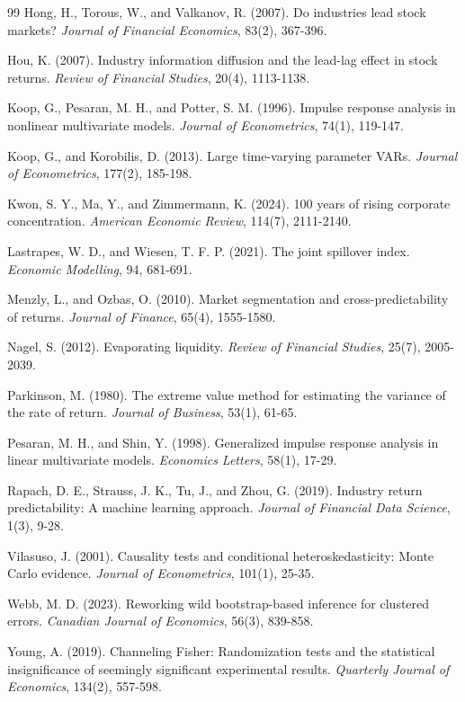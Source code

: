\documentclass[11pt]{article}
\begin{document}
\begin{thebibliography}{99}
Hong, H., Torous, W., and Valkanov, R. (2007). Do industries lead stock markets? \textit{Journal of Financial Economics}, 83(2), 367-396.

Hou, K. (2007). Industry information diffusion and the lead-lag effect in stock returns. \textit{Review of Financial Studies}, 20(4), 1113-1138.

Koop, G., Pesaran, M. H., and Potter, S. M. (1996). Impulse response analysis in nonlinear multivariate models. \textit{Journal of Econometrics}, 74(1), 119-147.

Koop, G., and Korobilis, D. (2013). Large time-varying parameter VARs. \textit{Journal of Econometrics}, 177(2), 185-198.

Kwon, S. Y., Ma, Y., and Zimmermann, K. (2024). 100 years of rising corporate concentration. \textit{American Economic Review}, 114(7), 2111-2140.

Lastrapes, W. D., and Wiesen, T. F. P. (2021). The joint spillover index. \textit{Economic Modelling}, 94, 681-691.

Menzly, L., and Ozbas, O. (2010). Market segmentation and cross-predictability of returns. \textit{Journal of Finance}, 65(4), 1555-1580.

Nagel, S. (2012). Evaporating liquidity. \textit{Review of Financial Studies}, 25(7), 2005-2039.

Parkinson, M. (1980). The extreme value method for estimating the variance of the rate of return. \textit{Journal of Business}, 53(1), 61-65.

Pesaran, M. H., and Shin, Y. (1998). Generalized impulse response analysis in linear multivariate models. \textit{Economics Letters}, 58(1), 17-29.

Rapach, D. E., Strauss, J. K., Tu, J., and Zhou, G. (2019). Industry return predictability: A machine learning approach. \textit{Journal of Financial Data Science}, 1(3), 9-28.

Vilasuso, J. (2001). Causality tests and conditional heteroskedasticity: Monte Carlo evidence. \textit{Journal of Econometrics}, 101(1), 25-35.

Webb, M. D. (2023). Reworking wild bootstrap-based inference for clustered errors. \textit{Canadian Journal of Economics}, 56(3), 839-858.

Young, A. (2019). Channeling Fisher: Randomization tests and the statistical insignificance of seemingly significant experimental results. \textit{Quarterly Journal of Economics}, 134(2), 557-598.

\end{thebibliography}
\end{document}
